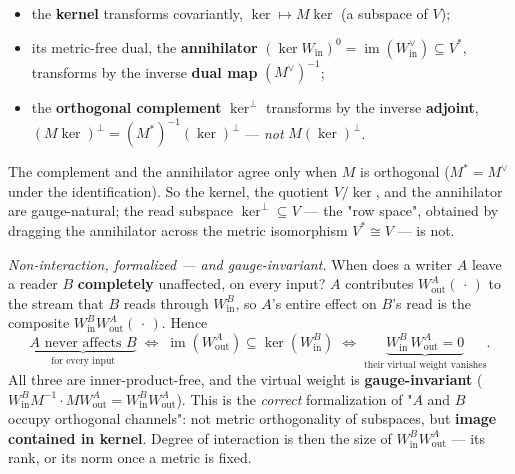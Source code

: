 \begin{itemize}
\item the \textbf{kernel} transforms covariantly, $\ker \mapsto M\ker$ (a subspace of $V$);
\item its metric-free dual, the \textbf{annihilator} $(\ker W_{\text{in}})^{0}=\operatorname{im}(W_{\text{in}}^{\vee})\subseteq V^{*}$, transforms by the inverse \textbf{dual map} $(M^{\vee})^{-1}$;
\item the \textbf{orthogonal complement} $\ker^{\perp}$ transforms by the inverse \textbf{adjoint}, $(M\ker)^{\perp} = (M^{*})^{-1}(\ker)^{\perp}$ --- \emph{not} $M(\ker)^{\perp}$.
\end{itemize}

The complement and the annihilator agree only when $M$ is orthogonal ($M^{*}=M^{\vee}$ under the identification). So the kernel, the quotient $V/\ker$, and the annihilator are gauge-natural; the read subspace $\ker^{\perp}\subseteq V$ --- the "row space", obtained by dragging the annihilator across the metric isomorphism $V^{*}\cong V$ --- is not.


\emph{Non-interaction, formalized --- and gauge-invariant.} When does a writer $A$ leave a reader $B$ \textbf{completely} unaffected, on every input? $A$ contributes $W_{\text{out}}^A(\,\cdot\,)$ to the stream that $B$ reads through $W_{\text{in}}^B$, so $A$'s entire effect on $B$'s read is the composite $W_{\text{in}}^B W_{\text{out}}^A(\,\cdot\,)$. Hence \[ \underbrace{A \text{ never affects } B}_{\text{for every input}} \;\iff\; \operatorname{im}(W_{\text{out}}^A) \subseteq \ker(W_{\text{in}}^B) \;\iff\; \underbrace{W_{\text{in}}^B\, W_{\text{out}}^A = 0}_{\text{their virtual weight vanishes}}. \] All three are inner-product-free, and the virtual weight is \textbf{gauge-invariant} ($W_{\text{in}}^B M^{-1}\cdot M W_{\text{out}}^A = W_{\text{in}}^B W_{\text{out}}^A$). This is the \emph{correct} formalization of "$A$ and $B$ occupy orthogonal channels": not metric orthogonality of subspaces, but \textbf{image contained in kernel}. Degree of interaction is then the size of $W_{\text{in}}^B W_{\text{out}}^A$ --- its rank, or its norm once a metric is fixed.


